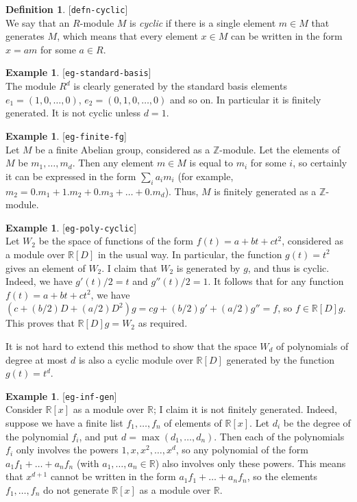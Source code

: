 \documentclass{amsart}
\newcommand{\lbl}[1]{\label{#1}\textup{[\texttt{#1}]}\ \\}
\newcommand{\lbl}{\label}
\newcommand{\R}         {{\mathbb{R}}}
\newcommand{\Z}         {{\mathbb{Z}}}
\renewcommand{\:}{\colon}
\theoremstyle{definition}
\newtheorem{definition}[theorem]{Definition}
\newtheorem{example}[theorem]{Example}
\begin{document}
\begin{definition}\lbl{defn-cyclic}
 We say that an $R$-module $M$ is \emph{cyclic} if there is a single
 element $m\in M$ that generates $M$, which means that every element
 $x\in M$ can be written in the form $x=am$ for some $a\in R$.
\end{definition}

\begin{example}\lbl{eg-standard-basis}
 The module $R^d$ is clearly generated by the standard basis elements
 $e_1=(1,0,\ldots,0)$, $e_2=(0,1,0,\ldots,0)$ and so on.  In
 particular it is finitely generated.  It is not cyclic unless $d=1$.
\end{example}
\begin{example}\lbl{eg-finite-fg}
 Let $M$ be a finite Abelian group, considered as a $\Z$-module.  Let
 the elements of $M$ be $m_1,\ldots,m_d$.  Then any element $m\in M$
 is equal to $m_i$ for some $i$, so certainly it can be expressed in
 the form $\sum_i a_im_i$ (for example,
 $m_2=0.m_1+1.m_2+0.m_3+\ldots+0.m_d$).  Thus, $M$ is finitely
 generated as a $\Z$-module.
\end{example}
\begin{example}\lbl{eg-poly-cyclic}
 Let $W_2$ be the space of functions of the form $f(t)=a+bt+ct^2$,
 considered as a module over $\R[D]$ in the usual way.  In particular,
 the function $g(t)=t^2$ gives an element of $W_2$.  I claim that
 $W_2$ is generated by $g$, and thus is cyclic.  Indeed, we have
 $g'(t)/2=t$ and $g''(t)/2=1$.  It follows that for any function
 $f(t)=a+bt+ct^2$, we have
 $(c+(b/2)D+(a/2)D^2)g=cg+(b/2)g'+(a/2)g''=f$, so $f\in\R[D]g$.  This
 proves that $\R[D]g=W_2$ as required.

 It is not hard to extend this method to show that the space $W_d$ of
 polynomials of degree at most $d$ is also a cyclic module over
 $\R[D]$ generated by the function $g(t)=t^d$.
\end{example}
\begin{example}\lbl{eg-inf-gen}
 Consider $\R[x]$ as a module over $\R$; I claim it is not finitely
 generated.  Indeed, suppose we have a finite list $f_1,\ldots,f_n$ of
 elements of $\R[x]$.  Let $d_i$ be the degree of the polynomial
 $f_i$, and put $d=\max(d_1,\ldots,d_n)$.  Then each of the
 polynomials $f_i$ only involves the powers $1,x,x^2,\ldots,x^d$, so
 any polynomial of the form $a_1f_1+\ldots+a_nf_n$ (with
 $a_1,\ldots,a_n\in\R$) also involves only these powers.  This means
 that $x^{d+1}$ cannot be written in the form $a_1f_1+\ldots+a_nf_n$,
 so the elements $f_1,\ldots,f_n$ do not generate $\R[x]$ as a module
 over $\R$.
\end{example}
\end{document}
